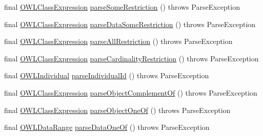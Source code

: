 \begin{DoxyCompactItemize}
\item 
final \hyperlink{interfaceorg_1_1semanticweb_1_1owlapi_1_1model_1_1_o_w_l_class_expression}{O\-W\-L\-Class\-Expression} \hyperlink{classuk_1_1ac_1_1manchester_1_1cs_1_1owlapi_1_1dlsyntax_1_1parser_1_1_d_l_syntax_parser_a86f223cdb0789322748a159d2e16d752}{parse\-Some\-Restriction} ()  throws Parse\-Exception 
\item 
final \hyperlink{interfaceorg_1_1semanticweb_1_1owlapi_1_1model_1_1_o_w_l_class_expression}{O\-W\-L\-Class\-Expression} \hyperlink{classuk_1_1ac_1_1manchester_1_1cs_1_1owlapi_1_1dlsyntax_1_1parser_1_1_d_l_syntax_parser_abef598d16c770f8135f4d4b2b8332cc0}{parse\-Data\-Some\-Restriction} ()  throws Parse\-Exception 
\item 
final \hyperlink{interfaceorg_1_1semanticweb_1_1owlapi_1_1model_1_1_o_w_l_class_expression}{O\-W\-L\-Class\-Expression} \hyperlink{classuk_1_1ac_1_1manchester_1_1cs_1_1owlapi_1_1dlsyntax_1_1parser_1_1_d_l_syntax_parser_aae73a607c46effc0eb73e77e96bdd684}{parse\-All\-Restriction} ()  throws Parse\-Exception 
\item 
final \hyperlink{interfaceorg_1_1semanticweb_1_1owlapi_1_1model_1_1_o_w_l_class_expression}{O\-W\-L\-Class\-Expression} \hyperlink{classuk_1_1ac_1_1manchester_1_1cs_1_1owlapi_1_1dlsyntax_1_1parser_1_1_d_l_syntax_parser_a71a75fdb99f17c9ab9a3501350b93ce8}{parse\-Cardinality\-Restriction} ()  throws Parse\-Exception 
\item 
final \hyperlink{interfaceorg_1_1semanticweb_1_1owlapi_1_1model_1_1_o_w_l_individual}{O\-W\-L\-Individual} \hyperlink{classuk_1_1ac_1_1manchester_1_1cs_1_1owlapi_1_1dlsyntax_1_1parser_1_1_d_l_syntax_parser_afcba9595fbbb2d2e8c38e66ebf321fd3}{parse\-Individual\-Id} ()  throws Parse\-Exception 
\item 
final \hyperlink{interfaceorg_1_1semanticweb_1_1owlapi_1_1model_1_1_o_w_l_class_expression}{O\-W\-L\-Class\-Expression} \hyperlink{classuk_1_1ac_1_1manchester_1_1cs_1_1owlapi_1_1dlsyntax_1_1parser_1_1_d_l_syntax_parser_a4e0ca8479dcbd839ac59fbd80d28f4b5}{parse\-Object\-Complement\-Of} ()  throws Parse\-Exception 
\item 
final \hyperlink{interfaceorg_1_1semanticweb_1_1owlapi_1_1model_1_1_o_w_l_class_expression}{O\-W\-L\-Class\-Expression} \hyperlink{classuk_1_1ac_1_1manchester_1_1cs_1_1owlapi_1_1dlsyntax_1_1parser_1_1_d_l_syntax_parser_a2335883a82d61f95c244b2f1ac07c08c}{parse\-Object\-One\-Of} ()  throws Parse\-Exception 
\item 
final \hyperlink{interfaceorg_1_1semanticweb_1_1owlapi_1_1model_1_1_o_w_l_data_range}{O\-W\-L\-Data\-Range} \hyperlink{classuk_1_1ac_1_1manchester_1_1cs_1_1owlapi_1_1dlsyntax_1_1parser_1_1_d_l_syntax_parser_aebaa997e4777ca1021a8354b19d99964}{parse\-Data\-One\-Of} ()  throws Parse\-Exception 

\end{DoxyCompactItemize}
